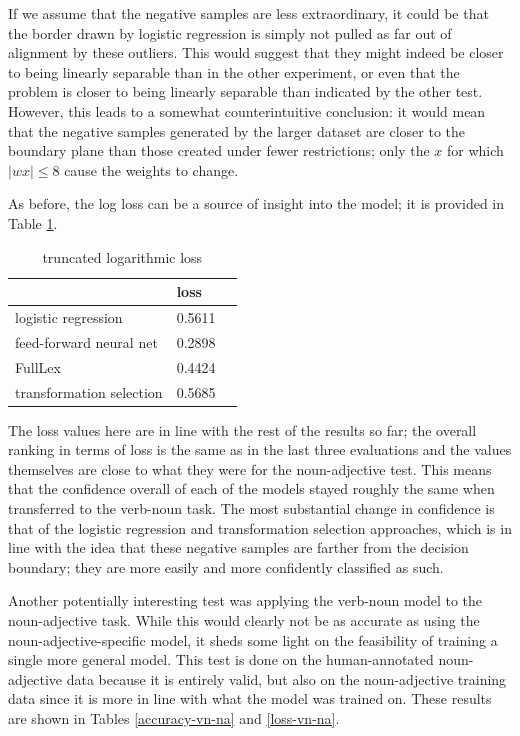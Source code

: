 \documentclass[a4paper, 12pt]{article}
\begin{document}
If we assume that the negative samples are less extraordinary, it could be that the border drawn by logistic regression is simply not pulled as far out of alignment by these outliers. This would suggest that they might indeed be closer to being linearly separable than in the other experiment, or even that the problem is closer to being linearly separable than indicated by the other test. However, this leads to a somewhat counterintuitive conclusion: it would mean that the negative samples generated by the larger dataset are closer to the boundary plane than those created under fewer restrictions; only the $ x $ for which $ | wx | \leq 8 $ cause the weights to change.

As before, the log loss can be a source of insight into the model; it is provided in Table \ref{loss-vn}.

\begin{table}[]
	\centering
	\begin{tabular}{l|l|l}
		                         & loss      \\ \hline
		logistic regression      & 0.5611    \\
		feed-forward neural net  & 0.2898    \\
		FullLex                  & 0.4424    \\
		transformation selection & 0.5685
	\end{tabular}
	\caption{truncated logarithmic loss}
	\label{loss-vn}
\end{table}

The loss values here are in line with the rest of the results so far; the overall ranking in terms of loss is the same as in the last three evaluations and the values themselves are close to what they were for the noun-adjective test. This means that the confidence overall of each of the models stayed roughly the same when transferred to the verb-noun task. The most substantial change in confidence is that of the logistic regression and transformation selection approaches, which is in line with the idea that these negative samples are farther from the decision boundary; they are more easily and more confidently classified as such.

Another potentially interesting test was applying the verb-noun model to the noun-adjective task. While this would clearly not be as accurate as using the noun-adjective-specific model, it sheds some light on the feasibility of training a single more general model. This test is done on the human-annotated noun-adjective data because it is entirely valid, but also on the noun-adjective training data since it is more in line with what the model was trained on. These results are shown in Tables \ref{accuracy-vn-na} and \ref{loss-vn-na}.
\end{document}
